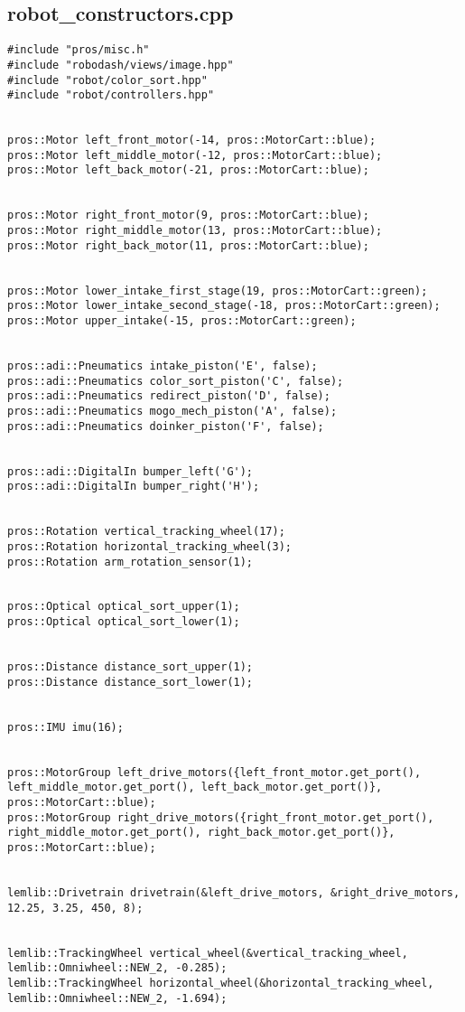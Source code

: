 \subsection*{robot_constructors.cpp}
\begin{verbatim}
#include "pros/misc.h"
#include "robodash/views/image.hpp"
#include "robot/color_sort.hpp"
#include "robot/controllers.hpp"


pros::Motor left_front_motor(-14, pros::MotorCart::blue);
pros::Motor left_middle_motor(-12, pros::MotorCart::blue);
pros::Motor left_back_motor(-21, pros::MotorCart::blue);


pros::Motor right_front_motor(9, pros::MotorCart::blue);
pros::Motor right_middle_motor(13, pros::MotorCart::blue);
pros::Motor right_back_motor(11, pros::MotorCart::blue);


pros::Motor lower_intake_first_stage(19, pros::MotorCart::green);
pros::Motor lower_intake_second_stage(-18, pros::MotorCart::green);
pros::Motor upper_intake(-15, pros::MotorCart::green);


pros::adi::Pneumatics intake_piston('E', false);
pros::adi::Pneumatics color_sort_piston('C', false);
pros::adi::Pneumatics redirect_piston('D', false);
pros::adi::Pneumatics mogo_mech_piston('A', false);
pros::adi::Pneumatics doinker_piston('F', false);


pros::adi::DigitalIn bumper_left('G');
pros::adi::DigitalIn bumper_right('H');


pros::Rotation vertical_tracking_wheel(17);
pros::Rotation horizontal_tracking_wheel(3);
pros::Rotation arm_rotation_sensor(1);


pros::Optical optical_sort_upper(1);
pros::Optical optical_sort_lower(1);


pros::Distance distance_sort_upper(1);
pros::Distance distance_sort_lower(1);


pros::IMU imu(16);


pros::MotorGroup left_drive_motors({left_front_motor.get_port(), left_middle_motor.get_port(), left_back_motor.get_port()}, pros::MotorCart::blue);
pros::MotorGroup right_drive_motors({right_front_motor.get_port(), right_middle_motor.get_port(), right_back_motor.get_port()}, pros::MotorCart::blue);


lemlib::Drivetrain drivetrain(&left_drive_motors, &right_drive_motors, 12.25, 3.25, 450, 8);


lemlib::TrackingWheel vertical_wheel(&vertical_tracking_wheel, lemlib::Omniwheel::NEW_2, -0.285);
lemlib::TrackingWheel horizontal_wheel(&horizontal_tracking_wheel, lemlib::Omniwheel::NEW_2, -1.694);



\end{verbatim}
